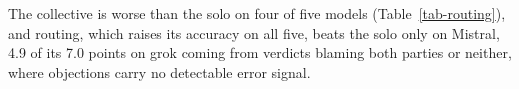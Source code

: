 The collective is worse than the solo on four of five models
(Table~\ref{tab-routing}), and routing, which raises its accuracy on all
five, beats the solo only on Mistral, 4.9 of its 7.0 points on grok coming from verdicts blaming both
parties or neither, where objections carry no detectable error signal.

